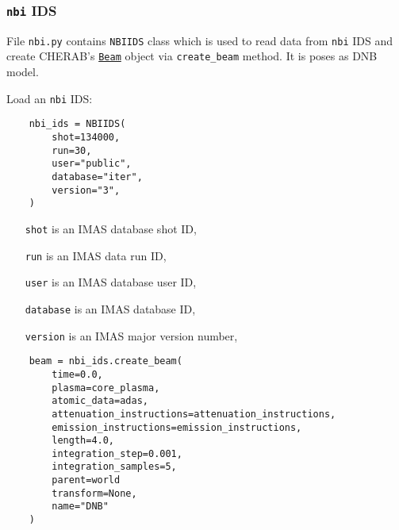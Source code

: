 \documentclass[../main.tex]{subfiles}
\begin{document}
\subsubsection{\texttt{nbi} IDS}%
\label{sec:nbi_ids}

File \texttt{nbi.py} contains \texttt{NBIIDS} class which is used to read data from \texttt{nbi} IDS and create CHERAB's \href{https://cherab.github.io/documentation/plasmas/particle_beams.html?highlight=beam#cherab.core.Beam}{\texttt{Beam}} object via \texttt{create\_beam} method. It is poses as DNB model.

Load an \texttt{nbi} IDS:
\begin{verbatim}
    nbi_ids = NBIIDS(
        shot=134000,
        run=30,
        user="public",
        database="iter",
        version="3",
    )
\end{verbatim}

\begin{itemize}[align=left]
    \item[\texttt{shot}] is an IMAS database shot ID,
    \item[\texttt{run}] is an IMAS data run ID,
    \item[\texttt{user}] is an IMAS database user ID,
    \item[\texttt{database}] is an IMAS database ID,
    \item[\texttt{version}] is an IMAS major version number,
\end{itemize}

\begin{verbatim}
    beam = nbi_ids.create_beam(
        time=0.0,
        plasma=core_plasma,
        atomic_data=adas,
        attenuation_instructions=attenuation_instructions,
        emission_instructions=emission_instructions,
        length=4.0,
        integration_step=0.001,
        integration_samples=5,
        parent=world
        transform=None,
        name="DNB"
    )
\end{verbatim}
\end{document}
